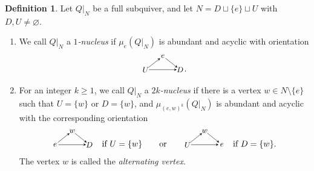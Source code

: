 \documentclass[10pt,a4paper]{amsart}
\theoremstyle{definition}
\newtheorem{definition}[definition]{Definition}
\theoremstyle{definition}
\numberwithin{equation}{section}
\numberwithin{table}{section}
\begin{document}
\begin{definition}\label{def:special-nucleus-types}
Let $Q|_N$ be a full subquiver, and let $N=D\sqcup\{e\}\sqcup U$
with $D,U\ne\varnothing$.
\begin{enumerate}[label=(\roman*),leftmargin=2.2em,itemsep=4pt]
\item We call $Q|_N$ a \emph{$1$-nucleus} if $\mu_e(Q|_N)$ is abundant
and acyclic with orientation
\[
\begin{tikzpicture}[>=stealth,scale=.68,baseline=-.5ex,
  every node/.style={font=\small,inner sep=1pt}]
  \coordinate (u) at (-1.05,0);
  \coordinate (e) at (0,0.82);
  \coordinate (d) at (1.05,0);
  \draw[->,shorten >=4pt,shorten <=4pt] (u)--(e);
  \draw[->,shorten >=4pt,shorten <=4pt] (e)--(d);
  \draw[->,shorten >=4pt,shorten <=4pt] (u)--(d);
  \node[fill=none] at (u) {$U$};
  \node[fill=none] at (e) {$e$};
  \node[fill=none] at (d) {$D$};
\end{tikzpicture}.
\]
\item For an integer $k\geq1$, we call $Q|_N$ a \emph{$2k$-nucleus} if
there is a vertex $w\in N\setminus\{e\}$ such that $U=\{w\}$ or $D=\{w\}$,
and $\mu_{(e,w)^k}(Q|_N)$ is abundant and acyclic with the corresponding orientation
\[
\begin{tikzpicture}[>=stealth,scale=.68,baseline=-.5ex,
  every node/.style={font=\small,inner sep=1pt}]
  \coordinate (e) at (-1.05,0);
  \coordinate (w) at (0,0.82);
  \coordinate (d) at (1.05,0);
  \draw[->,shorten >=4pt,shorten <=4pt] (e)--(w);
  \draw[->,shorten >=4pt,shorten <=4pt] (w)--(d);
  \draw[->,shorten >=4pt,shorten <=4pt] (e)--(d);
  \node[fill=none] at (e) {$e$};
  \node[fill=none] at (w) {$w$};
  \node[fill=none] at (d) {$D$};
\end{tikzpicture}\quad\text{if }U=\{w\}
\qquad\text{or}\qquad
\begin{tikzpicture}[>=stealth,scale=.68,baseline=-.5ex,
  every node/.style={font=\small,inner sep=1pt}]
  \coordinate (u) at (-1.05,0);
  \coordinate (w) at (0,0.82);
  \coordinate (e) at (1.05,0);
  \draw[->,shorten >=4pt,shorten <=4pt] (u)--(w);
  \draw[->,shorten >=4pt,shorten <=4pt] (w)--(e);
  \draw[->,shorten >=4pt,shorten <=4pt] (u)--(e);
  \node[fill=none] at (u) {$U$};
  \node[fill=none] at (w) {$w$};
  \node[fill=none] at (e) {$e$};
\end{tikzpicture}\quad\text{if }D=\{w\}.
\]
The vertex $w$ is called the \emph{alternating vertex}.
\end{enumerate}
\end{definition}
\end{document}
